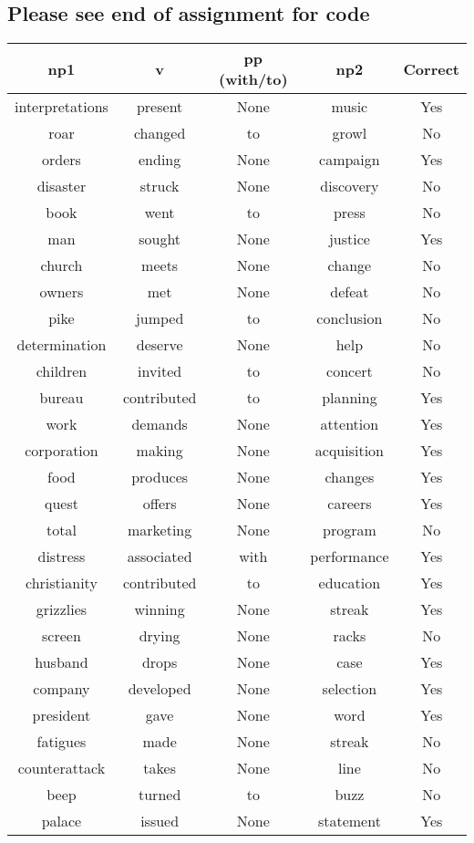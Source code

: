\documentclass[11pt]{article}
\begin{document}
\subsection{Please see end of assignment for code}
\begin{tabular}{c c c c c}
np1 & v & pp (with/to) & np2  & Correct\\ \hline
interpretations & present & None & music & Yes\\
roar & changed & to & growl & No\\
orders & ending & None & campaign & Yes\\
disaster & struck & None & discovery & No\\
book & went & to & press & No \\
man & sought & None & justice & Yes \\
church & meets & None & change & No\\
owners & met & None & defeat & No\\
pike & jumped & to & conclusion & No \\
determination & deserve & None & help & No\\
children & invited & to & concert & No\\
bureau & contributed & to & planning & Yes\\
work & demands & None & attention & Yes\\
corporation & making & None & acquisition& Yes \\
food & produces & None & changes & Yes\\
quest & offers & None & careers & Yes\\
total & marketing & None & program & No\\
distress & associated & with & performance & Yes \\
christianity & contributed & to & education & Yes\\
grizzlies & winning & None & streak & Yes\\
screen & drying & None & racks & No\\
husband & drops & None & case & Yes\\
company & developed & None & selection & Yes\\
president & gave & None & word & Yes\\
fatigues & made & None & streak & No\\
counterattack & takes & None & line & No\\
beep & turned & to & buzz & No\\
palace & issued & None & statement & Yes\\

\end{tabular}
\end{document}
